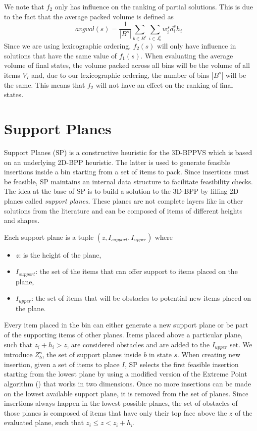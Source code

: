 We note that $f_2$ only has influence on the ranking of partial solutions. This is due to the fact that the average packed volume is defined as
\begin{equation}
    \label{eq:average_volume}
    avgvol(s) = \frac{1}{|B^s|} \sum\limits_{b \in B^s}{\sum\limits_{i \in J^s_b}{w^s_i d^s_i h_i}}
\end{equation}
Since we are using lexicographic ordering, $f_2(s)$ will only have influence in solutions that have the same value of $f_1(s)$.
When evaluating the average volume of final states, the volume packed across all bins will be the volume of all items $V_I$ and, due to our lexicographic ordering, the number of bins $|B^s|$ will be the same.
This means that $f_2$ will not have an effect on the ranking of final states.

\section{Support Planes}
\label{sec:support_planes}%
Support Planes (SP) is a constructive heuristic for the 3D-BPPVS which is based on an underlying 2D-BPP heuristic. The latter is used to generate feasible insertions inside a bin starting from a set of items to pack.
Since insertions must be feasible, SP maintains an internal data structure to facilitate feasibility checks.
The idea at the base of SP is to build a solution to the 3D-BPP by filling 2D planes called \textit{support planes}.
These planes are not complete layers like in other solutions from the literature and can be composed of items of different heights and shapes.

Each support plane is a tuple $(z, I_{support}, I_{upper})$ where
\begin{itemize}
    \item $z$: is the height of the plane,
    \item $I_{support}$: the set of the items that can offer support to items placed on the plane,
    \item $I_{upper}$: the set of items that will be obstacles to potential new items placed on the plane.
\end{itemize}

Every item placed in the bin can either generate a new support plane or be part of the supporting items of other planes.
Items placed above a particular plane, such that $z_i + h_i > z$, are considered obstacles and are added to the $I_{upper}$ set.
We introduce $Z^s_b$, the set of support planes inside $b$ in state $s$.
When creating new insertion, given a set of items to place $I$, SP selects the first feasible insertion starting from the lowest plane by using a modified version of the Extreme Point algorithm (\cite{crainic2008extreme}) that works in two dimensions.
Once no more insertions can be made on the lowest available support plane, it is removed from the set of planes.
Since insertions always happen in the lowest possible planes, the set of obstacles of those planes is composed of items that have only their top face above the $z$ of the evaluated plane, such that $z_i \le z < z_i + h_i$.

